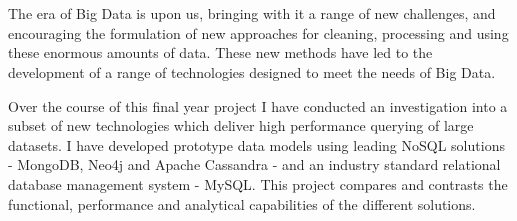 \section*{}
The era of Big Data is upon us, bringing with it a range of new challenges, and encouraging the formulation of new approaches for cleaning, processing and using these enormous amounts of data. These new methods have led to the development of a range of technologies designed to meet the needs of Big Data.

Over the course of this final year project I have conducted an investigation into a subset of new technologies which deliver high performance querying of large datasets. I have developed prototype data models using leading NoSQL solutions - MongoDB, Neo4j and Apache Cassandra - and an industry standard relational database management system - MySQL. This project compares and contrasts the functional, performance and analytical capabilities of the different solutions.
